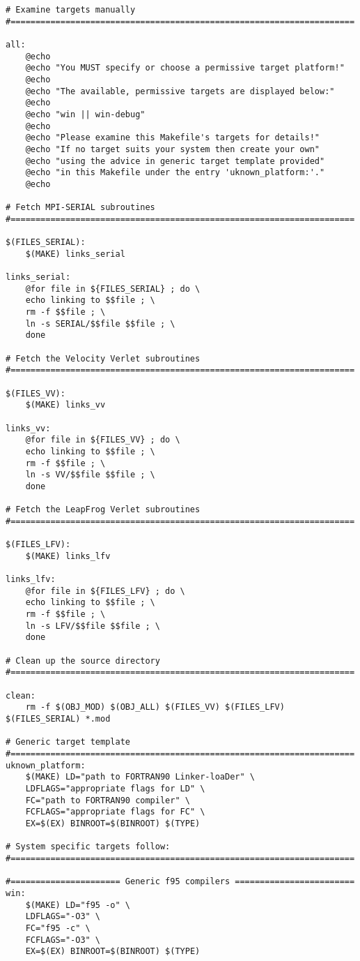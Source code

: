 \begin{verbatim}
# Examine targets manually
#=====================================================================

all:
	@echo
	@echo "You MUST specify or choose a permissive target platform!"
	@echo
	@echo "The available, permissive targets are displayed below:"
	@echo
	@echo "win || win-debug"
	@echo
	@echo "Please examine this Makefile's targets for details!"
	@echo "If no target suits your system then create your own"
	@echo "using the advice in generic target template provided"
	@echo "in this Makefile under the entry 'uknown_platform:'."
	@echo

# Fetch MPI-SERIAL subroutines
#=====================================================================

$(FILES_SERIAL):
	$(MAKE) links_serial

links_serial:
	@for file in ${FILES_SERIAL} ; do \
	echo linking to $$file ; \
	rm -f $$file ; \
	ln -s SERIAL/$$file $$file ; \
	done

# Fetch the Velocity Verlet subroutines
#=====================================================================

$(FILES_VV):
	$(MAKE) links_vv

links_vv:
	@for file in ${FILES_VV} ; do \
	echo linking to $$file ; \
	rm -f $$file ; \
	ln -s VV/$$file $$file ; \
	done

# Fetch the LeapFrog Verlet subroutines
#=====================================================================

$(FILES_LFV):
	$(MAKE) links_lfv

links_lfv:
	@for file in ${FILES_LFV} ; do \
	echo linking to $$file ; \
	rm -f $$file ; \
	ln -s LFV/$$file $$file ; \
	done

# Clean up the source directory
#=====================================================================

clean:
	rm -f $(OBJ_MOD) $(OBJ_ALL) $(FILES_VV) $(FILES_LFV) $(FILES_SERIAL) *.mod

# Generic target template
#=====================================================================
uknown_platform:
	$(MAKE) LD="path to FORTRAN90 Linker-loaDer" \
	LDFLAGS="appropriate flags for LD" \
	FC="path to FORTRAN90 compiler" \
	FCFLAGS="appropriate flags for FC" \
	EX=$(EX) BINROOT=$(BINROOT) $(TYPE)

# System specific targets follow:
#=====================================================================

#====================== Generic f95 compilers ========================
win:
	$(MAKE) LD="f95 -o" \
	LDFLAGS="-O3" \
	FC="f95 -c" \
	FCFLAGS="-O3" \
	EX=$(EX) BINROOT=$(BINROOT) $(TYPE)


\end{verbatim}

